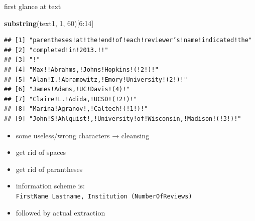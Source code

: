 \documentclass[ignorenonframetext,]{beamer}
\newenvironment{Shaded}{\begin{snugshade}}{\end{snugshade}}
\newcommand{\KeywordTok}[1]{\textcolor[rgb]{0.13,0.29,0.53}{\textbf{{#1}}}}
\newcommand{\DecValTok}[1]{\textcolor[rgb]{0.00,0.00,0.81}{{#1}}}
\newcommand{\NormalTok}[1]{{#1}}
\providecommand{\tightlist}{%
  \setlength{\itemsep}{0pt}\setlength{\parskip}{0pt}}
\begin{document}
\begin{frame}[fragile]{first glance at text}

\begin{Shaded}
\begin{Highlighting}[]
\KeywordTok{substring}\NormalTok{(text1, }\DecValTok{1}\NormalTok{, }\DecValTok{60}\NormalTok{)[}\DecValTok{6}\NormalTok{:}\DecValTok{14}\NormalTok{]}
\end{Highlighting}
\end{Shaded}

\begin{verbatim}
## [1] "parentheses!at!the!end!of!each!reviewer’s!name!indicated!the"
## [2] "completed!in!2013.!!"                                        
## [3] "!"                                                           
## [4] "Max!!Abrahms,!Johns!Hopkins!(!2!)!"                          
## [5] "Alan!I.!Abramowitz,!Emory!University!(2!)!"                  
## [6] "James!Adams,!UC!Davis!(4)!"                                  
## [7] "Claire!L.!Adida,!UCSD!(!2!)!"                                
## [8] "Marina!Agranov!,!Caltech!(!1!)!"                             
## [9] "John!S!Ahlquist!,!University!of!Wisconsin,!Madison!(!3!)!"
\end{verbatim}

\begin{itemize}
\tightlist
\item
  some useless/wrong characters → cleansing
\item
  get rid of spaces
\item
  get rid of parantheses
\item
  information scheme is: \newline{}
  \texttt{FirstName\ Lastname,\ Institution\ (NumberOfReviews)}
\item
  followed by actual extraction
\end{itemize}

\end{frame}
\end{document}
